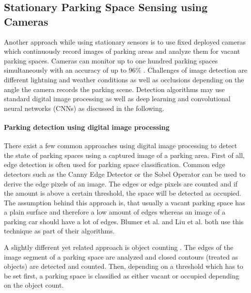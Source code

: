 \subsection{Stationary Parking Space Sensing using Cameras}
\label{sec:stationary_park_sensing_cameras}

Another approach while using stationary sensors is to use fixed deployed cameras which continuously record images of parking areas and analyze them for vacant parking spaces. Cameras can monitor up to one hundred parking spaces simultaneously with an accuracy of up to 96\% \cite{DiMauro2016}. Challenges of image detection are different lightning and weather conditions as well as occlusions depending on the angle the camera records the parking scene. Detection algorithms may use standard digital image processing as well as deep learning and convolutional neural networks (CNNs) as discussed in the following.


\paragraph{Parking detection using digital image processing}

There exist a few common approaches using digital image processing to detect the state of parking spaces using a captured image of a parking area. First of all, edge detection is often used for parking space classification. Common edge detectors such as the Canny Edge Detector \cite{Canny1986} or the Sobel Operator \cite{Sobel} can be used to derive the edge pixels of an image. The edges or edge pixels are counted and if the amount is above a certain threshold, the space will be detected as occupied. The assumption behind this approach is, that usually a vacant parking space has a plain surface and therefore a low amount of edges whereas an image of a parking car should have a lot of edges. Blumer et al. \cite{Blumer2012} and Liu et al. \cite{stationary_camera_sensing} both use this technique as part of their algorithms.

A slightly different yet related approach is object counting \cite{stationary_camera_sensing}. The edges of the image segment of a parking space are analyzed and closed contours (treated as objects) are detected and counted. Then, depending on a threshold which has to be set first, a parking space is classified as either vacant or occupied depending on the object count.

